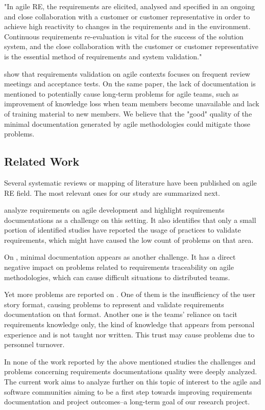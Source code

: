 \begin{displayquote}
"In agile RE, the requirements are elicited, analysed and specified in an ongoing and close collaboration with a customer or customer representative in order to achieve high reactivity to changes in the requirements and in the environment. Continuous requirements re-evaluation is vital for the success of the solution system, and the close collaboration with the customer or customer representative is the essential method of requirements and system validation."
\end{displayquote}

\cite{Paetsch_2003} show that requirements validation on agile contexts focuses on frequent review meetings and acceptance tests. On the same paper, the lack of documentation is mentioned to potentially cause long-term problems for agile teams, such as improvement of knowledge loss when team members become unavailable and lack of training material to new members. We believe that the "good" quality of the minimal documentation generated by agile methodologies could mitigate those problems. 

\subsection{Related Work}

Several systematic reviews or mapping of literature have been published on agile RE field. The most relevant ones for our study are summarized next.

\cite{Medeiros_2015} analyze requirements on agile development and highlight requirements documentations as a challenge on this setting. It also identifies that only a small portion of identified studies have reported the usage of practices to validate requirements, which might have caused the low count of problems on that area.

On \cite{Inayat_2015}, minimal documentation appears as another challenge. It has a direct negative impact on problems related to requirements traceability on agile methodologies, which can cause difficult situations to distributed teams. 

Yet more problems are reported on \cite{Heikkil_2015}. One of them is the insufficiency of the user story format, causing problems to represent and validate requirements documentation on that format. Another one is the teams' reliance on tacit requirements knowledge only, the kind of knowledge that appears from personal experience and is not taught nor written. This trust may cause problems due to personnel turnover. 

In none of the work reported by the above mentioned studies the challenges and problems concerning requirements documentations quality were deeply analyzed. The current work aims to analyze further on this topic of interest to the agile and software communities aiming to be a first step towards improving requirements documentation and project outcomes--a long-term goal of our research project.